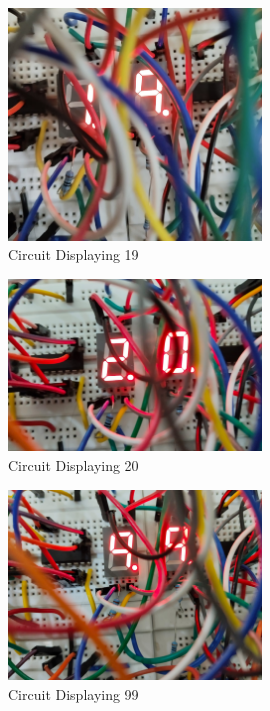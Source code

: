 \documentclass[a4paper,12pt]{article}
\begin{document}
\begin{figure}[H]
\centering
\includegraphics[width=0.6\textwidth]{figs/r_19.jpeg}
	\caption*{Circuit Displaying 19}
\end{figure}
\begin{figure}[H]
\centering
\includegraphics[width=0.6\textwidth]{figs/r_20.jpeg}
	\caption*{Circuit Displaying 20}
\end{figure}
\begin{figure}[H]
\centering
\includegraphics[width=0.6\textwidth]{figs/r_99.jpeg}
	\caption*{Circuit Displaying 99}
\end{figure}
\newpage
\end{document}
